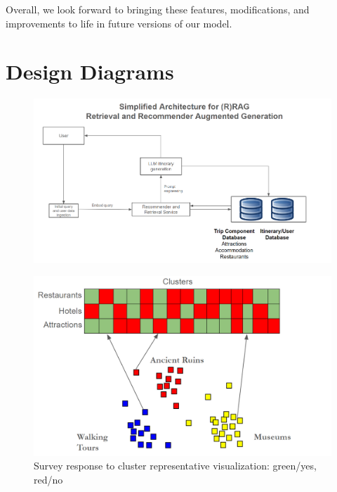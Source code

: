 \documentclass[12pt,a4paper]{report}
\begin{document}
Overall, we look forward to bringing these features, modifications, and improvements to life in future versions of our model. 



\appendix

\chapter{Design Diagrams}

\begin{figure}[H]
    \centering
    \includegraphics[scale=.7]{systemdiagram}
\end{figure}

\begin{figure}[H]
    \centering
    \includegraphics[scale=.6]{surveytoclusters}
    \caption{Survey response to cluster representative visualization: green/yes, red/no}
\end{figure}
\end{document}
